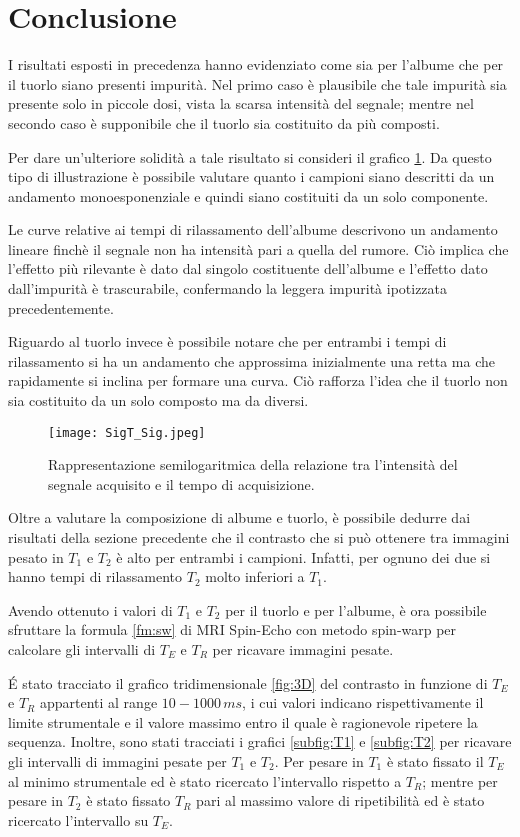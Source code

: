 \section*{Conclusione}
I risultati esposti in precedenza hanno evidenziato come sia per l'albume che per il tuorlo siano presenti impurità.
Nel primo caso è plausibile che tale impurità sia presente solo in piccole dosi, vista la scarsa intensità del segnale; mentre nel secondo caso è supponibile che il tuorlo sia costituito da più composti.

Per dare un'ulteriore solidità a tale risultato si consideri il grafico \ref{fig:SigT_Sig}. 
Da questo tipo di illustrazione è possibile valutare quanto i campioni siano descritti da un andamento monoesponenziale e quindi siano costituiti da un solo componente.

Le curve relative ai tempi di rilassamento dell'albume descrivono un andamento lineare finchè il segnale non ha intensità pari a quella del rumore. 
Ciò implica che l'effetto più rilevante è dato dal singolo costituente dell'albume e l'effetto dato dall'impurità è trascurabile, confermando la leggera impurità ipotizzata precedentemente.

Riguardo al tuorlo invece è possibile notare che per entrambi i tempi di rilassamento si ha un andamento che approssima inizialmente una retta ma che rapidamente si inclina per formare una curva.
Ciò rafforza l'idea che il tuorlo non sia costituito da un solo composto ma da diversi.

\begin{figure}[h!]
\centering
\texttt{[image: SigT\_Sig.jpeg]}
\caption{Rappresentazione semilogaritmica della relazione tra l'intensità del segnale acquisito e il tempo di acquisizione.}
\label{fig:SigT_Sig}
\end{figure}
\newpage
Oltre a valutare la composizione di albume e tuorlo, è possibile dedurre dai risultati della sezione precedente che il contrasto che si può ottenere tra immagini pesato in $T_1$ e $T_2$ è alto per entrambi i campioni.
Infatti, per ognuno dei due si hanno tempi di rilassamento $T_2$ molto inferiori a $T_1$.

Avendo ottenuto i valori di $T_1$ e $T_2$ per il tuorlo e per l'albume, è ora possibile sfruttare la formula \ref{fm:sw} di MRI Spin-Echo con metodo spin-warp per calcolare gli intervalli di $T_E$ e $T_R$ per ricavare immagini pesate.

\'E stato tracciato il grafico tridimensionale \ref{fig:3D} del contrasto in funzione di $T_E$ e $T_R$ appartenti al range $10-1000\,ms$, i cui valori indicano rispettivamente il limite strumentale e il valore massimo entro il quale è ragionevole ripetere la sequenza. 
Inoltre, sono stati tracciati i grafici \ref{subfig:T1} e \ref{subfig:T2} per ricavare gli intervalli di immagini pesate per $T_1$ e $T_2$.
Per pesare in $T_1$ è stato fissato il $T_E$ al minimo strumentale ed è stato ricercato l'intervallo rispetto a $T_R$; mentre per pesare in $T_2$ è stato fissato $T_R$ pari al massimo valore di ripetibilità ed è stato ricercato l'intervallo su $T_E$.


